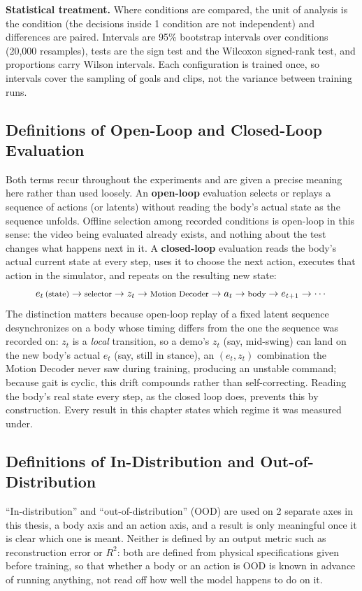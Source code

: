 \documentclass[12pt,a4paper,oneside]{report}
\begin{document}
\noindent\textbf{Statistical treatment.} Where conditions are compared, the unit of analysis is the condition (the
decisions inside 1 condition are not independent) and differences are paired. Intervals are 95\% bootstrap intervals
over conditions (20{,}000 resamples), tests are the sign test and the Wilcoxon signed-rank test, and proportions carry
Wilson intervals. Each configuration is trained once, so intervals cover the sampling of goals and clips, not the
variance between training runs.

\newpage
\subsection{Definitions of Open-Loop and Closed-Loop Evaluation}
Both terms recur throughout the experiments and are given a precise meaning here rather than used loosely. An \textbf{open-loop} evaluation selects or replays a sequence of actions (or latents) without reading
the body's actual state as the sequence unfolds. Offline selection among recorded conditions
is open-loop in this sense: the video being evaluated already exists, and nothing about the test changes what
happens next in it. A \textbf{closed-loop} evaluation reads the body's actual current state at every step, uses
it to choose the next action, executes that action in the simulator, and repeats on the resulting new state:
\[
\footnotesize
e_t \,\text{(state)} \to \text{selector} \to z_t \to \text{Motion Decoder} \to a_t \to \text{body} \to e_{t+1} \to \cdots
\]
The distinction matters because open-loop replay of a fixed latent sequence desynchronizes on a body whose timing
differs from the one the sequence was recorded on: $z_t$ is a \emph{local} transition, so a demo's $z_t$ (say,
mid-swing) can land on the new body's actual $e_t$ (say, still in stance), an $(e_t, z_t)$ combination the Motion
Decoder never saw during training, producing an unstable command; because gait is cyclic, this drift compounds
rather than self-correcting. Reading the body's real state every step, as the closed loop does, prevents this by
construction. Every result in this chapter states which regime it was measured under.

\subsection{Definitions of In-Distribution and Out-of-Distribution}
``In-distribution'' and ``out-of-distribution'' (OOD) are used on 2 separate axes in this thesis, a body axis
and an action axis, and a result is only meaningful once it is clear which one is meant. Neither is defined by
an output metric such as reconstruction error or $R^2$: both are defined from physical specifications given
before training, so that whether a body or an action is OOD is known in advance of running anything, not read
off how well the model happens to do on it.
\end{document}
